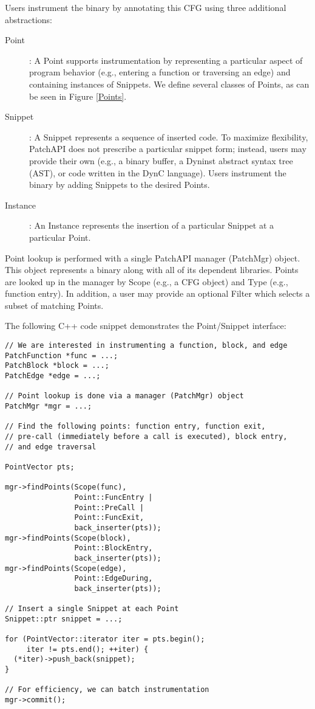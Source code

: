 Users instrument the binary by annotating this CFG using three
additional abstractions:
\begin{description}
\item[Point]: A Point supports instrumentation by representing a
  particular aspect of program behavior (e.g., entering a function or
  traversing an edge) and containing instances of Snippets. We define
  several classes of Points, as can be seen in Figure \ref{Points}.
\item[Snippet]: A Snippet represents a sequence of inserted code. To
  maximize flexibility, PatchAPI does not prescribe a particular
  snippet form; instead, users may provide their own (e.g., a binary
  buffer, a Dyninst abstract syntax tree (AST), or code written in the
  DynC language). Users instrument the binary by adding Snippets to
  the desired Points. 
\item[Instance]: An Instance represents the insertion of a particular
  Snippet at a particular Point.
\end{description}

Point lookup is performed with a single PatchAPI manager (PatchMgr)
object. This object represents a binary along with all of its
dependent libraries. Points are looked up in the manager by Scope
(e.g., a CFG object) and Type (e.g., function entry). In addition, a
user may provide an optional Filter which selects a subset of matching
Points.

The following C++ code snippet demonstrates the Point/Snippet
interface:

\begin{verbatim}
// We are interested in instrumenting a function, block, and edge
PatchFunction *func = ...;
PatchBlock *block = ...;
PatchEdge *edge = ...;

// Point lookup is done via a manager (PatchMgr) object
PatchMgr *mgr = ...;

// Find the following points: function entry, function exit,
// pre-call (immediately before a call is executed), block entry,
// and edge traversal

PointVector pts;

mgr->findPoints(Scope(func),
                Point::FuncEntry | 
                Point::PreCall | 
                Point::FuncExit,
                back_inserter(pts));
mgr->findPoints(Scope(block),
                Point::BlockEntry,
                back_inserter(pts));
mgr->findPoints(Scope(edge),
                Point::EdgeDuring,
                back_inserter(pts));

// Insert a single Snippet at each Point
Snippet::ptr snippet = ...;

for (PointVector::iterator iter = pts.begin(); 
     iter != pts.end(); ++iter) {
  (*iter)->push_back(snippet);
}

// For efficiency, we can batch instrumentation
mgr->commit();

\end{verbatim}


